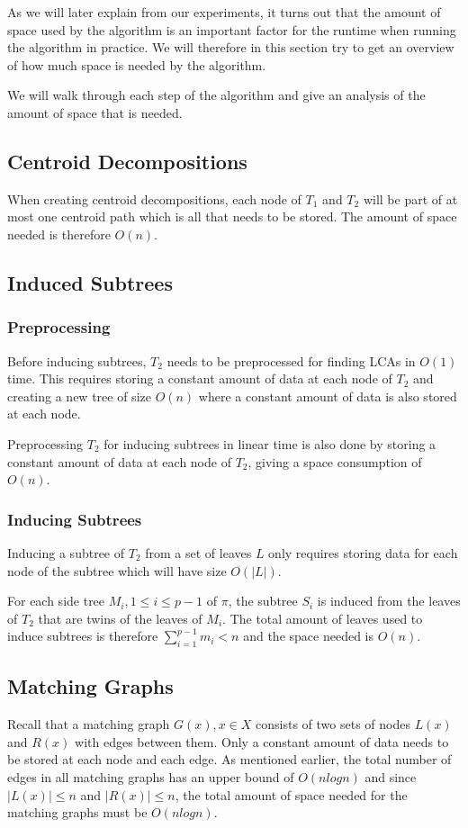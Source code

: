 As we will later explain from our experiments, it turns out that the amount of space used by the algorithm is an important factor for the runtime when running the algorithm in practice. We will therefore in this section try to get an overview of how much space is needed by the algorithm.

We will walk through each step of the algorithm and give an analysis of the amount of space that is needed.

\subsection{Centroid Decompositions}
When creating centroid decompositions, each node of $T_1$ and $T_2$ will be part of at most one centroid path which is all that needs to be stored. The amount of space needed is therefore $O(n)$.

\subsection{Induced Subtrees}
\subsubsection{Preprocessing}
Before inducing subtrees, $T_2$ needs to be preprocessed for finding LCAs in $O(1)$ time. This requires storing a constant amount of data at each node of $T_2$ and creating a new tree of size $O(n)$ where a constant amount of data is also stored at each node.

Preprocessing $T_2$ for inducing subtrees in linear time is also done by storing a constant amount of data at each node of $T_2$, giving a space consumption of $O(n)$.

\subsubsection{Inducing Subtrees}
Inducing a subtree of $T_2$ from a set of leaves $L$ only requires storing data for each node of the subtree which will have size $O(|L|)$.

For each side tree $M_i, 1 \le i \le p-1$ of $\pi$, the subtree $S_i$ is induced from the leaves of $T_2$ that are twins of the leaves of $M_i$. The total amount of leaves used to induce subtrees is therefore $\sum_{i=1}^{p-1} m_i < n$ and the space needed is $O(n)$.

\subsection{Matching Graphs}
Recall that a matching graph $G(x), x \in X$ consists of two sets of nodes $L(x)$ and $R(x)$ with edges between them. Only a constant amount of data needs to be stored at each node and each edge. As mentioned earlier, the total number of edges in all matching graphs has an upper bound of $O(nlogn)$ and since $|L(x)| \le n$ and $|R(x)| \le n$, the total amount of space needed for the matching graphs must be $O(nlogn)$.

